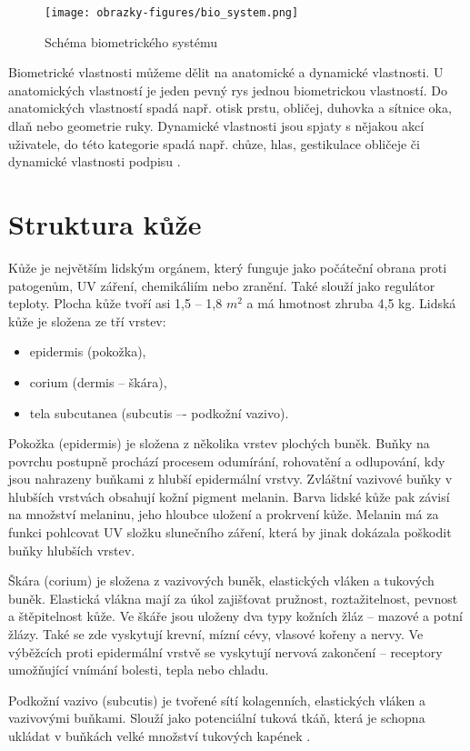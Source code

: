 \begin{figure}[!htbp]
    \centering
    \texttt{[image: obrazky-figures/bio\_system.png]}
    \caption{Schéma biometrického systému \cite{BIOopora}}
\end{figure}

Biometrické vlastnosti můžeme dělit na anatomické a dynamické vlastnosti. U anatomických vlastností je jeden pevný rys jednou biometrickou vlastností. Do anatomických vlastností spadá např. otisk prstu, obličej, duhovka a sítnice oka, dlaň nebo geometrie ruky. Dynamické vlastnosti jsou spjaty s nějakou akcí uživatele, do této kategorie spadá např. chůze, hlas, gestikulace obličeje či dynamické vlastnosti podpisu \cite{BIOopora}. 
\section{Struktura kůže}
Kůže je největším lidským orgánem, který funguje jako počáteční obrana proti patogenům, UV záření, chemikáliím nebo zranění. Také slouží jako regulátor teploty. Plocha kůže tvoří asi 1,5 -- 1,8 $m^2$ a má hmotnost zhruba 4,5 kg. 
Lidská kůže je složena ze tří vrstev:
\begin{itemize}
    \item epidermis (pokožka),
    \item corium (dermis -- škára),
    \item tela subcutanea (subcutis –- podkožní vazivo).
\end{itemize}

Pokožka (epidermis) je složena z několika vrstev plochých buněk. Buňky na povrchu postupně prochází procesem odumírání, rohovatění a odlupování, kdy jsou nahrazeny buňkami z hlubší epidermální vrstvy. Zvláštní vazivové buňky v hlubších vrstvách obsahují kožní pigment melanin. Barva lidské kůže pak závisí na množství melaninu, jeho hloubce uložení a prokrvení kůže. Melanin má za funkci pohlcovat UV složku slunečního záření, která by jinak dokázala poškodit buňky hlubších vrstev.

Škára (corium) je složena z vazivových buněk, elastických vláken a tukových buněk. Elastická vlákna mají za úkol zajišťovat pružnost, roztažitelnost, pevnost a štěpitelnost kůže. Ve škáře jsou uloženy dva typy kožních žláz -- mazové a potní žlázy. Také se zde vyskytují krevní, mízní cévy, vlasové kořeny a nervy. Ve výběžcích proti epidermální vrstvě se vyskytují nervová zakončení -- receptory umožňující vnímání bolesti, tepla nebo chladu.

Podkožní vazivo (subcutis) je tvořené sítí kolagenních, elastických vláken a vazivovými buňkami. Slouží jako potenciální tuková tkáň, která je schopna ukládat v buňkách velké množství tukových kapének \cite{ZakladyFunkcniAnatomieCloveka}.

